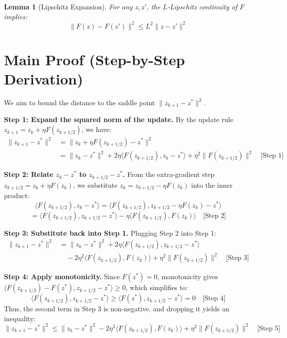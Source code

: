 \documentclass{article}
\newtheorem{lemma}{Lemma}
\begin{document}
\begin{lemma}[Lipschitz Expansion]
For any $z, z'$, the $L$-Lipschitz continuity of $F$ implies:
$$ \|F(z) - F(z')\|^2 \leq L^2 \|z - z'\|^2 $$
\end{lemma}

\section*{Main Proof (Step-by-Step Derivation)}
We aim to bound the distance to the saddle point $\|z_{k+1} - z^*\|^2$.

\textbf{Step 1: Expand the squared norm of the update.}
By the update rule $z_{k+1} = z_k + \eta F(z_{k+1/2})$, we have:
\begin{align*}
    \|z_{k+1} - z^*\|^2 &= \|z_k + \eta F(z_{k+1/2}) - z^*\|^2 \\
    &= \|z_k - z^*\|^2 + 2\eta \langle F(z_{k+1/2}), z_k - z^* \rangle + \eta^2 \|F(z_{k+1/2})\|^2 \quad \text{[Step 1]}
\end{align*}

\textbf{Step 2: Relate $z_k - z^*$ to $z_{k+1/2} - z^*$.}
From the extra-gradient step $z_{k+1/2} = z_k + \eta F(z_k)$, we substitute $z_k = z_{k+1/2} - \eta F(z_k)$ into the inner product:
$$ \langle F(z_{k+1/2}), z_k - z^* \rangle = \langle F(z_{k+1/2}), z_{k+1/2} - \eta F(z_k) - z^* \rangle $$
$$ = \langle F(z_{k+1/2}), z_{k+1/2} - z^* \rangle - \eta \langle F(z_{k+1/2}), F(z_k) \rangle \quad \text{[Step 2]} $$

\textbf{Step 3: Substitute back into Step 1.}
Plugging Step 2 into Step 1:
\begin{align*}
    \|z_{k+1} - z^*\|^2 &= \|z_k - z^*\|^2 + 2\eta \langle F(z_{k+1/2}), z_{k+1/2} - z^* \rangle \\
    &\quad - 2\eta^2 \langle F(z_{k+1/2}), F(z_k) \rangle + \eta^2 \|F(z_{k+1/2})\|^2 \quad \text{[Step 3]}
\end{align*}

\textbf{Step 4: Apply monotonicity.}
Since $F(z^*) = 0$, monotonicity gives $\langle F(z_{k+1/2}) - F(z^*), z_{k+1/2} - z^* \rangle \geq 0$, which simplifies to:
$$ \langle F(z_{k+1/2}), z_{k+1/2} - z^* \rangle \geq \langle F(z^*), z_{k+1/2} - z^* \rangle = 0 \quad \text{[Step 4]} $$
Thus, the second term in Step 3 is non-negative, and dropping it yields an inequality:
$$ \|z_{k+1} - z^*\|^2 \leq \|z_k - z^*\|^2 - 2\eta^2 \langle F(z_{k+1/2}), F(z_k) \rangle + \eta^2 \|F(z_{k+1/2})\|^2 \quad \text{[Step 5]} $$
\end{document}
